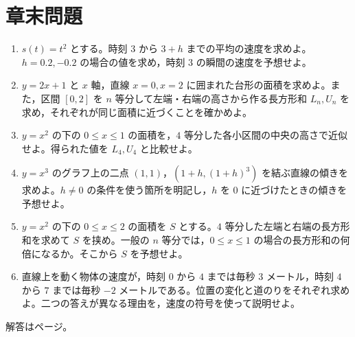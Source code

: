 \section*{章末問題}
\begin{enumerate}[label=\textbf{\thechapter.\arabic*},leftmargin=*]
 \item\label{問:導入速度} $s(t)=t^2$ とする。時刻 $3$ から $3+h$ までの平均の速度を求めよ。$h=0.2,-0.2$ の場合の値を求め，時刻 $3$ の瞬間の速度を予想せよ。
 \item\label{問:導入直線面積} $y=2x+1$ と $x$ 軸，直線 $x=0,x=2$ に囲まれた台形の面積を求めよ。また，区間 $[0,2]$ を $n$ 等分して左端・右端の高さから作る長方形和 $L_n,U_n$ を求め，それぞれが同じ面積に近づくことを確かめよ。
 \item\label{問:導入中点} $y=x^2$ の下の $0\le x\le1$ の面積を，$4$ 等分した各小区間の中央の高さで近似せよ。得られた値を $L_4,U_4$ と比較せよ。
 \item\label{問:導入三次割線} $y=x^3$ のグラフ上の二点 $(1,1)$，$(1+h,(1+h)^3)$ を結ぶ直線の傾きを求めよ。$h\ne0$ の条件を使う箇所を明記し，$h$ を $0$ に近づけたときの傾きを予想せよ。
 \item\label{問:導入拡大面積} $y=x^2$ の下の $0\le x\le2$ の面積を $S$ とする。$4$ 等分した左端と右端の長方形和を求めて $S$ を挟め。一般の $n$ 等分では，$0\le x\le1$ の場合の長方形和の何倍になるか。そこから $S$ を予想せよ。
 \item\label{問:導入符号} 直線上を動く物体の速度が，時刻 $0$ から $4$ までは毎秒 $3$ メートル，時刻 $4$ から $7$ までは毎秒 $-2$ メートルである。位置の変化と道のりをそれぞれ求めよ。二つの答えが異なる理由を，速度の符号を使って説明せよ。
\end{enumerate}

\smallskip\noindent 解答は\pageref{解答:第1章}ページ。
